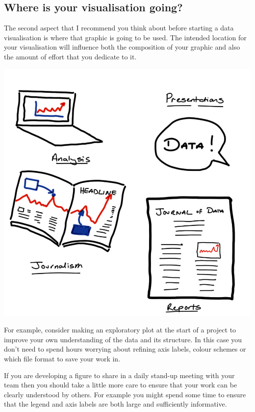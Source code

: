 \documentclass[
  letterpaper,
  DIV=11,
  numbers=noendperiod]{scrreprt}
\begin{document}
\subsection{Where is your visualisation
going?}\label{where-is-your-visualisation-going}

The second aspect that I recommend you think about before starting a
data visualisation is where that graphic is going to be used. The
intended location for your visualisation will influence both the
composition of your graphic and also the amount of effort that you
dedicate to it.

\includegraphics{images/303-data-visualisation/visualisation-purposes.png}

For example, consider making an exploratory plot at the start of a
project to improve your own understanding of the data and its structure.
In this case you don't need to spend hours worrying about refining axis
labels, colour schemes or which file format to save your work in.

If you are developing a figure to share in a daily stand-up meeting with
your team then you should take a little more care to ensure that your
work can be clearly understood by others. For example you might spend
some time to ensure that the legend and axis labels are both large and
sufficiently informative.
\end{document}
